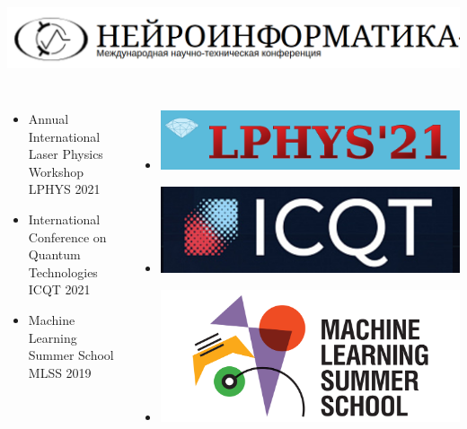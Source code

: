 \begin{frame}[t,allowframebreaks]
\begin{columns}
\includegraphics[width=1\linewidth]{Presentation/images/logo/neuroinfo.png}
\end{columns}

\begin{columns}
\begin{itemize}
\vspace{40pt}
\setlength\itemsep{1.5em}
    \item[] Annual International Laser Physics Workshop\\
    LPHYS 2021
    \item[] International Conference on Quantum Technologies\\
    ICQT 2021
    \item[] Machine Learning Summer School\\
    MLSS 2019
\end{itemize} 

\vspace{50pt}
\begin{itemize}
\setlength\itemsep{1.5em}
    \item[] {\includegraphics[width=1\linewidth]{Presentation/images/logo/lphys.png}}
    \item[] {\includegraphics[width=1\linewidth]{Presentation/images/logo/icqt.png}}
    \item[] {\includegraphics[width=1\linewidth]{Presentation/images/logo/mlss.png}}
\end{itemize}

\end{columns}

\end{frame}

